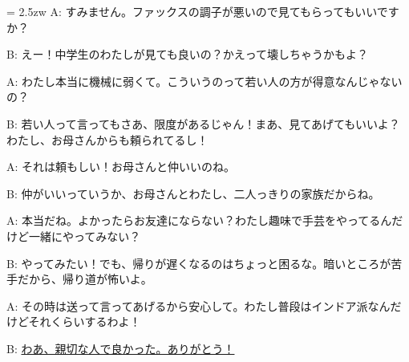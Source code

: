 \documentclass[11pt]{amsart}
\title{}
\author{}
\newenvironment{hangall}[1]{\hangindent = 2.5zw\everypar{\hangindent = 2.5zw}}{}
\begin{document}
\maketitle
\begin{hangall}{}%
A: すみません。ファックスの調子が悪いので見てもらってもいいですか？

B: えー！中学生のわたしが見ても良いの？かえって壊しちゃうかもよ？

A: わたし本当に機械に弱くて。こういうのって若い人の方が得意なんじゃないの？

B: 若い人って言ってもさあ、限度があるじゃん！まあ、見てあげてもいいよ？わたし、お母さんからも頼られてるし！

A: それは頼もしい！お母さんと仲いいのね。

B: 仲がいいっていうか、お母さんとわたし、二人っきりの家族だからね。

A: 本当だね。よかったらお友達にならない？わたし趣味で手芸をやってるんだけど一緒にやってみない？

B: やってみたい！でも、帰りが遅くなるのはちょっと困るな。暗いところが苦手だから、帰り道が怖いよ。

A: その時は送って言ってあげるから安心して。わたし普段はインドア派なんだけどそれくらいするわよ！

B: \ul{わあ、親切な人で良かった。ありがとう！}\end{hangall}
\end{document}
